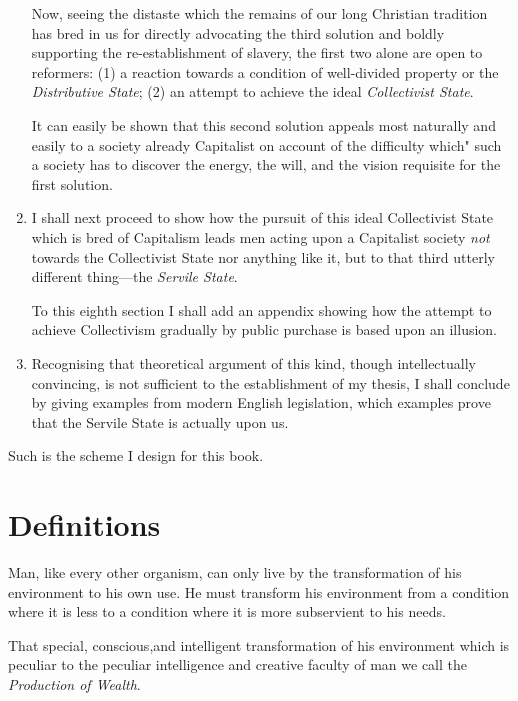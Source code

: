 \documentclass{book}
\begin{document}
\begin{enumerate}
\begin{enumerate}
	      \end{enumerate}

	      Now, seeing the distaste which the remains of our long Christian tradition has bred in us for directly advocating the third solution and boldly supporting the re-establishment of slavery, the first two alone are open to reformers: (1) a reaction towards a condition of well-divided property or the \emph{Distributive State}; (2) an attempt to achieve the ideal \emph{Collectivist State}.

	      It can easily be shown that this second solution appeals most naturally and easily to a society already Capitalist on account of the difficulty which" such a society has to discover the energy, the will, and the vision requisite for the first solution.

	\item I shall next proceed to show how the pursuit of this ideal Collectivist State which is bred of Capitalism leads men acting upon a Capitalist society \emph{not} towards the Collectivist State nor anything like it, but to that third utterly different thing—the \emph{Servile State}.

	      To this eighth section I shall add an appendix showing how the attempt to achieve Collectivism gradually by public purchase is based upon an illusion.

	\item Recognising that theoretical argument of this kind, though intellectually convincing, is not sufficient to the establishment of my thesis, I shall conclude by giving examples from modern English legislation, which examples prove that the Servile State is actually upon us.

\end{enumerate}

Such is the scheme I design for this book.

\chapter{Definitions}
\label{chapter-1}
Man, like every other organism, can only live by the transformation of his environment to his own use. He must transform his environment from a condition where it is less to a condition where it is more subservient to his needs.

That special, conscious,and intelligent transformation of his environment which is peculiar to the peculiar intelligence and creative faculty of man we call the \emph{Production of Wealth}.
\end{document}
